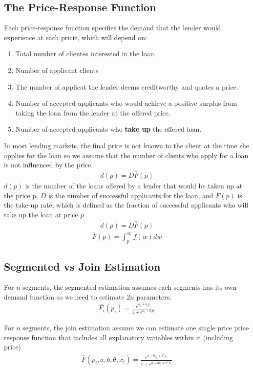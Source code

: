 \documentclass[12pt]{book}
\begin{document}
\subsection{The Price-Response Function}
Each price-response function specifies the demand that the lender would experience at each pricie, which will depend on:
\begin{enumerate}
    \item Total number of clientes interested in the loan
    \item Number of applicant clients
    \item The number of applicat the lender deems creditworthy and quotes a price.
    \item Number of accepted applicants who would achieve a positive surplus from taking the loan from the lender at the offered price.
    \item Number of accepted applicants who \textbf{ take up} the offered loan.
\end{enumerate}
In most lending markets, the final price is not known to the client at the time she applies for the loan so we assume that the number of clients who apply for a loan is not influenced by the price.
\begin{align}
d(p)=D\bar{F}(p)
\end{align}
$d(p)$ is the number of the loans offered by a lender that would be taken up at the price p. $D$ is the number of successful applicants for the loan, and $\overline{F}(p)$ is the take-up rate, which is defined as the fraction of successful applicants who will take up the loan at price $p$
\begin{align}
d(p)=D\bar{F}(p)
\end{align}
\begin{align}
\bar{F}(p)=\int^\infty_p f(w)dw
\end{align}
\subsection{Segmented vs Join Estimation}
For $n$ segments, the segmented estimation assumes each segments has its own demand function so we need to estimate $2n$ parameters.
\begin{align}
\bar{F_i}(p_i)=\frac{e^{a_i+b_i p_i}}{1+e^{a_i+b_i p_i}}
\end{align}

For $n$ segments, the join estimation assume we can estimate one single price price response function that includes all explanatory variables within it (including price)
\begin{align}
\bar{F}(p_i,a,b,\theta,x_i)=\frac{e^{a+b p_i+\theta^T x_i}}{1+e^{a+b p_i+\theta^T x_i}}
\end{align}
\end{document}
